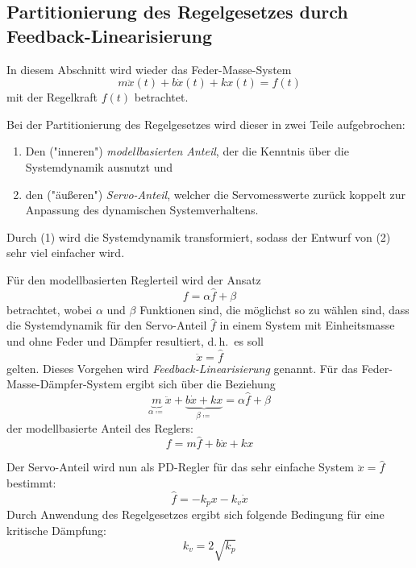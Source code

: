 \documentclass[a4paper, 11pt, accentcolor = tud3b]{tudreport}
\renewcommand{\dh}{d.\,h.~}
\begin{document}
			\subsection{Partitionierung des Regelgesetzes durch Feedback-Linearisierung}
				\label{sec:feedback_linearization}
			
				In diesem Abschnitt wird wieder das Feder-Masse-System
				\begin{equation*}
					m\ddot{x}(t) + b\dot{x}(t) + kx(t) = f(t)
				\end{equation*}
				mit der Regelkraft \( f(t) \) betrachtet.
			
				Bei der Partitionierung des Regelgesetzes wird dieser in zwei Teile aufgebrochen:
				\begin{enumerate}
					\item Den ("inneren") \emph{modellbasierten Anteil}, der die Kenntnis über die Systemdynamik ausnutzt und
					\item den ("äußeren") \emph{Servo-Anteil}, welcher die Servomesswerte zurück koppelt zur Anpassung des dynamischen Systemverhaltens.
				\end{enumerate}
				Durch (1) wird die Systemdynamik transformiert, sodass der Entwurf von (2) sehr viel einfacher wird.
				
				Für den modellbasierten Reglerteil wird der Ansatz
				\begin{equation*}
					f = \alpha \hat{f} + \beta
				\end{equation*}
				betrachtet, wobei \( \alpha \) und \( \beta \) Funktionen sind, die möglichst so zu wählen sind, dass die Systemdynamik für den Servo-Anteil \( \hat{f} \) in einem System mit Einheitsmasse und ohne Feder und Dämpfer resultiert, \dh es soll
				\begin{equation*}
					\ddot{x} = \hat{f}
				\end{equation*}
				gelten. Dieses Vorgehen wird \emph{Feedback-Linearisierung} genannt. Für das Feder-Masse-Dämpfer-System ergibt sich über die Beziehung
				\begin{equation*}
					\underbrace{m}_{\alpha \coloneqq}\ddot{x} + \underbrace{b\dot{x} + kx}_{\beta \coloneqq} = \alpha \hat{f} + \beta
				\end{equation*}
				der modellbasierte Anteil des Reglers:
				\begin{equation*}
					f = m \hat{f} + b\dot{x} + kx
				\end{equation*}
				
				Der Servo-Anteil wird nun als PD-Regler für das sehr einfache System \( \ddot{x} = \hat{f} \) bestimmt:
				\begin{equation*}
					\hat{f} = -k_p x - k_v \dot{x}
				\end{equation*}
				Durch Anwendung des Regelgesetzes ergibt sich folgende Bedingung für eine kritische Dämpfung:
				\begin{equation*}
					k_v = 2 \sqrt{k_p}
				\end{equation*}
				
\end{document}
